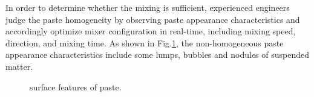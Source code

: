 \documentclass[pdflatex,sn-mathphys]{sn-jnl}%
\theoremstyle{thmstyleone}%
\theoremstyle{thmstyletwo}%
\theoremstyle{thmstylethree}%
\begin{document}
In order to determine whether the mixing is sufficient, experienced engineers judge the paste homogeneity by observing paste appearance characteristics and accordingly optimize mixer configuration in real-time, including mixing speed, direction, and mixing time\cite{min11121362, LI2022129007, MixingTime}. As shown in Fig.\ref{fig:surface_features}, the non-homogeneous paste appearance characteristics include some lumps, bubbles and nodules of suspended matter.            
\begin{figure}[htb]
    \centering
    \hfill
    \hfill
    \hfill
    \caption{surface features of paste.}
    \label{fig:surface_features}
\end{figure}
\end{document}
